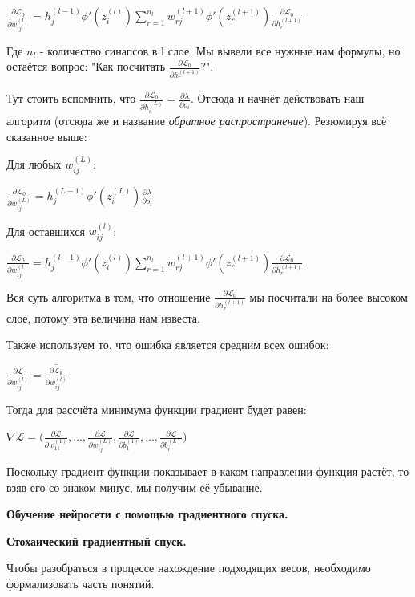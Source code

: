\documentclass[12pt]{extarticle}
\begin{document}
	\centerline{$\frac{\partial \mathcal{L}_0}{\partial w_{ij}^{(l)}} = h_j^{(l-1)} \phi'(z_i^{(l)}) \displaystyle \sum_{r=1}^{n_l}w_{rj}^{(l+1)}\phi '(z_r^{(l+1)})\frac{\partial \mathcal{L}_0}{\partial h_r^{(l+1)}}$}
	Где $n_l$ - количество синапсов в l слое. Мы вывели все нужные нам формулы, но остаётся вопрос: "Как посчитать $\frac{\partial \mathcal{L}_0}{\partial h_r^{(l+1)}}$?". 
	
	Тут стоить вспомнить, что $\frac{\partial \mathcal{L}_0}{\partial h_i^{(L)}} = \frac{\partial \lambda}{\partial o_i}$. Отсюда и начнёт действовать наш алгоритм (отсюда же и название \textit{обратное распространение}). Резюмируя всё сказанное выше:
	
	
	
	Для любых $w_{ij}^{(L)}$:
	
	\centerline{$\frac{\partial \mathcal{L}_0}{\partial w_{ij}^{(L)}} = h_j^{(L-1)} \phi'(z_i^{(L)}) \frac{\partial \lambda}{\partial o_i}$}
	
	Для оставшихся $w_{ij}^{(l)}$:
	
	\centerline{$\frac{\partial \mathcal{L}_0}{\partial w_{ij}^{(l)}} = h_j^{(l-1)} \phi'(z_i^{(l)}) \displaystyle \sum_{r=1}^{n_l}w_{rj}^{(l+1)}\phi '(z_r^{(l+1)})\frac{\partial \mathcal{L}_0}{\partial h_r^{(l+1)}}$}
	
	Вся суть алгоритма в том, что отношение $\frac{\partial \mathcal{L}_0}{\partial h_r^{(l+1)}}$ мы посчитали на более высоком слое, потому эта величина нам известа.
	
	
	Также используем то, что ошибка является средним всех ошибок:
	
	\centerline{$\frac{\partial \mathcal{L}}{\partial w_{ij}^{(l)}} = \overline{\frac{\partial \mathcal{L}_k}{\partial w_{ij}^{(l)}}}$}
	
	Тогда для рассчёта минимума функции градиент будет равен:
	
	\centerline{$\nabla \mathcal{L} = \Big(\frac{\partial \mathcal{L}}{\partial w_{11}^{(1)}}, \dots, \frac{\partial \mathcal{L}}{\partial w_{ij}^{(L)}}, \frac{\partial \mathcal{L}}{\partial b_{1}^{(1)}}, \dots, \frac{\partial \mathcal{L}}{\partial b_{i}^{(L)}}\Big)$}
	Поскольку градиент функции показывает в каком направлении функция растёт, то взяв его со знаком минус, мы получим её убывание.
	
	\centerline{\textbf{Обучение нейросети с помощью градиентного спуска.}}
	\centerline{\textbf{Стохаический градиентный спуск.}}
	
	Чтобы разобраться в процессе нахождение подходящих весов, необходимо формализовать часть понятий. 
	
\end{document}
